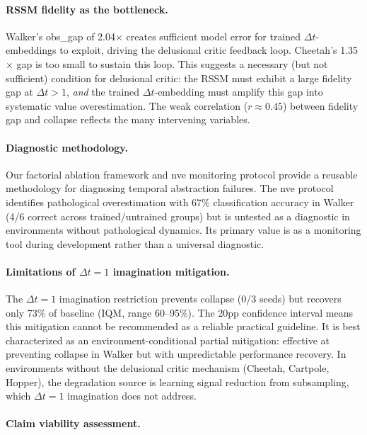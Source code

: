 \documentclass[10pt,letterpaper]{article}
\begin{document}
\paragraph{RSSM fidelity as the bottleneck.}
Walker's obs\_gap of 2.04$\times$ creates sufficient model error for trained $\Delta t$-embeddings to exploit, driving the delusional critic feedback loop. Cheetah's 1.35$\times$ gap is too small to sustain this loop. This suggests a necessary (but not sufficient) condition for delusional critic: the RSSM must exhibit a large fidelity gap at $\Delta t{>}1$, \emph{and} the trained $\Delta t$-embedding must amplify this gap into systematic value overestimation. The weak correlation ($r \approx 0.45$) between fidelity gap and collapse reflects the many intervening variables.

\paragraph{Diagnostic methodology.}
Our factorial ablation framework and nve monitoring protocol provide a reusable methodology for diagnosing temporal abstraction failures. The nve protocol identifies pathological overestimation with 67\% classification accuracy in Walker (4/6 correct across trained/untrained groups) but is untested as a diagnostic in environments without pathological dynamics. Its primary value is as a monitoring tool during development rather than a universal diagnostic.

\paragraph{Limitations of $\Delta t{=}1$ imagination mitigation.}
The $\Delta t{=}1$ imagination restriction prevents collapse (0/3 seeds) but recovers only 73\% of baseline (IQM, range 60--95\%). The 20pp confidence interval means this mitigation cannot be recommended as a reliable practical guideline. It is best characterized as an environment-conditional partial mitigation: effective at preventing collapse in Walker but with unpredictable performance recovery. In environments without the delusional critic mechanism (Cheetah, Cartpole, Hopper), the degradation source is learning signal reduction from subsampling, which $\Delta t{=}1$ imagination does not address.

\paragraph{Claim viability assessment.}
\end{document}
